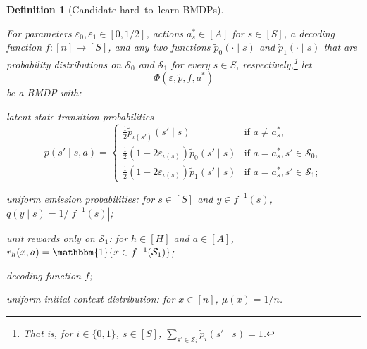 \documentclass[11pt]{article}
\newcommand{\mcS}{\mathcal{S}}
\newtheorem{definition}[theorem]{Definition}
\theoremstyle{definition}
\theoremstyle{definition}
\begin{document}
\begin{definition}
	[Candidate hard--to--learn \glspl{BMDP}]
	\label{def:hard-to-learn-BMDP-instance}

	For parameters $\varepsilon_0,\varepsilon_1\in [0,1/2]$, actions $a_s^*\in [A]$ for $s\in[S]$, a decoding function $f:[n]\rightarrow [S]$,
	and any two functions $\tilde{p}_0(\cdot \mid s)$ and $\tilde{p}_1(\cdot \mid s)$ that are probability distributions on $\mcS_0$ and $\mcS_1$ for every $s \in S$, respectively,\footnote{That is, for $i \in \{ 0, 1 \}$, $s\in[S]$, $\sum_{s'\in\mcS_i}\tilde{p}_i(s' \mid s) = 1$.}
	let
	\begin{equation}
		\Phi( \varepsilon, \tilde{p}, f, a^*)
	\end{equation}
	be a \gls{BMDP} with:
	\begin{definitionenum}
		\item \label{def:hard-BMDP--latent-state-transition-probabilities}
		latent state transition probabilities
		\begin{equation}
			p(s'\mid s,a)
			=
			\begin{cases}
				\frac{1}{2}
				\tilde{p}_{\iota(s')}(s' \mid s)
				 &
				\text{if }
				a\neq a^*_s,
				\\
				\frac{1}{2}
				(1-2\varepsilon_{\iota(s)})\tilde{p}_{0}(s' \mid s)
				 &
				\text{if }
				a=a^*_s
				,
				s'\in\mcS_0
				,
				\\
				\frac{1}{2}
				(1+2\varepsilon_{\iota(s)})\tilde{p}_{1}(s' \mid s)
				 &
				\text{if }
				a=a^*_s
				,
				s'\in\mcS_1
				;
			\end{cases}
			\label{eqn:latent_state_transition_kernel_macro_def}
		\end{equation}

		\item \label{def:hard-BMDP--uniform_emissions}
		uniform emission probabilities:
		for $s\in[S]$ and $y\in f^{-1}(s)$,
		$q(y\mid s)=1/|f^{-1}(s)|$;

		\item \label{def:hard-BMDP--unit-rewards}
		unit rewards only on $\mathcal{S}_1$: for $h\in[H]$ and $a\in[A]$,
		$
			r_h(x,a)
			=
			\mathbbm{1}\{x \in f^{-1}(\mcS_1)\}
		$;

		\item
		decoding function $f$;

		\item \label{def:hard-BMDP--uniform_initial_distribution}
		uniform initial context distribution: for $x \in[n]$, $\mu(x)=1/n$.
	\end{definitionenum}
\end{definition}
\end{document}
